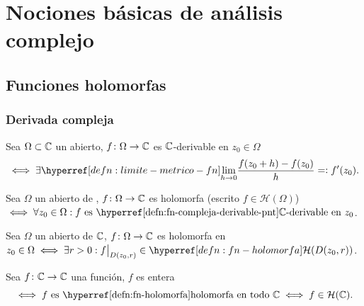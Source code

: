 \chapter{Nociones básicas de análisis complejo}\label{appendix1}

\section{Funciones holomorfas}

\subsection{Derivada compleja}

\begin{defn}\label{defn:fn-compleja-derivable-pnt}
    Sea $\Omega \subset \mathbb{C}$ un abierto, $f \colon \Omega \to \mathbb{C}$ es $\mathbb{C}$-derivable en $z_0\in\Omega$
    \[
        \iff \exists \exhyperref[defn:limite-metrico-fn]{limite-fn}{\lim_{h\to 0}} \frac{f(z_0+h)-f(z_0)}{h} \eqdef f'(z_0).
    \]
\end{defn}

\begin{defn}\label{defn:fn-holomorfa}
    Sea $\Omega$ un abierto de , $f \colon \Omega \to \mathbb{C}$ es holomorfa (escrito $f \in \mathcal{H}(\Omega)$) $\iff \forall z_0\in\Omega : f \tex{ es \exhyperref[defn:fn-compleja-derivable-pnt]{fn-compleja-derivable-pnt}{$\C$-derivable en $z_0$}}$.
\end{defn}

\begin{defn}\label{defn:fn-holomorfa-pnt}
    Sea $\Omega$ un abierto de $\mathbb{C}$, $f \colon \Omega \to \mathbb{C}$ es holomorfa en $z_0\in\Omega\iff \exists r> 0 : f\big|_{D(z_0, r)} \in \exhyperref[defn:fn-holomorfa]{fn-holomorfa}{\mathcal{H}}(D(z_0, r))$.
\end{defn}

\begin{defn}\label{defn:fn-entera}
    Sea $f \colon \mathbb{C} \to \mathbb{C}$ una función, $f$ es entera
    \[\iff f\tex{ es \exhyperref[defn:fn-holomorfa]{fn-holomorfa}{holomorfa} en todo } \C \iff f \in \mathcal{H}(\C).\]
\end{defn}

